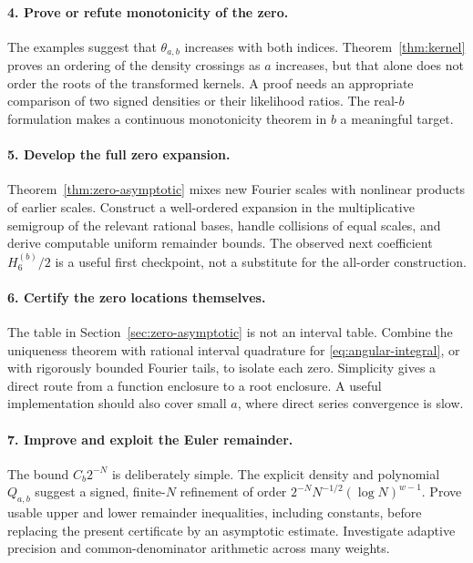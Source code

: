 \documentclass[11pt,a4paper]{article}
\numberwithin{equation}{section}
\theoremstyle{definition}
\theoremstyle{remark}
\begin{document}
\paragraph{4. Prove or refute monotonicity of the zero.}
The examples suggest that $\theta_{a,b}$ increases with both indices. Theorem~\ref{thm:kernel} proves an ordering of the density crossings as $a$ increases, but that alone does not order the roots of the transformed kernels. A proof needs an appropriate comparison of two signed densities or their likelihood ratios. The real-$b$ formulation makes a continuous monotonicity theorem in $b$ a meaningful target.

\paragraph{5. Develop the full zero expansion.}
Theorem~\ref{thm:zero-asymptotic} mixes new Fourier scales with nonlinear products of earlier scales. Construct a well-ordered expansion in the multiplicative semigroup of the relevant rational bases, handle collisions of equal scales, and derive computable uniform remainder bounds. The observed next coefficient $H_6^{(b)}/2$ is a useful first checkpoint, not a substitute for the all-order construction.

\paragraph{6. Certify the zero locations themselves.}
The table in Section~\ref{sec:zero-asymptotic} is not an interval table. Combine the uniqueness theorem with rational interval quadrature for \eqref{eq:angular-integral}, or with rigorously bounded Fourier tails, to isolate each zero. Simplicity gives a direct route from a function enclosure to a root enclosure. A useful implementation should also cover small $a$, where direct series convergence is slow.

\paragraph{7. Improve and exploit the Euler remainder.}
The bound $C_b2^{-N}$ is deliberately simple. The explicit density and polynomial $Q_{a,b}$ suggest a signed, finite-$N$ refinement of order $2^{-N}N^{-1/2}(\log N)^{w-1}$. Prove usable upper and lower remainder inequalities, including constants, before replacing the present certificate by an asymptotic estimate. Investigate adaptive precision and common-denominator arithmetic across many weights.
\end{document}
